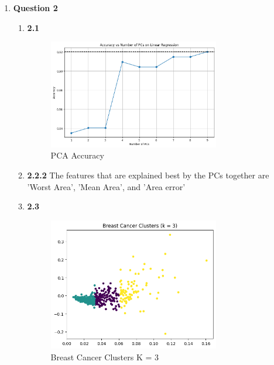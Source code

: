 \documentclass[12pt]{article}
\begin{document}
\begin{enumerate}
  \item \textbf{Question 2}
  \begin{enumerate}
    \item \textbf{2.1}
    \begin{figure}[H]
      \centering 
      \includegraphics[width=0.75\textwidth]{2_1.png}
      \caption{PCA Accuracy}
    \end{figure}
    \item \textbf{2.2.2}
      The features that are explained best by the PCs together are 'Worst Area', 'Mean Area', and 'Area error'
    \item \textbf{2.3}

    \begin{figure}[H]
      \centering 
      \includegraphics[width=0.75\textwidth]{2_3_3.png}
      \caption{Breast Cancer Clusters K = 3}
    \end{figure}


\end{enumerate}
\end{enumerate}
\end{document}
